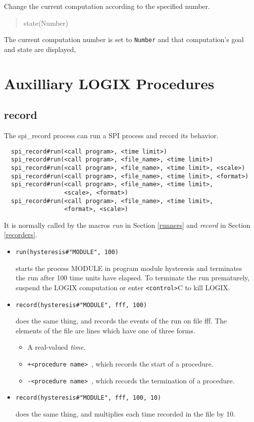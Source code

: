 Change the current computation according to the specified number.

\begin{verse}
    state(Number) 
\end{verse}

The current computation number is set to \verb+Number+ and
that computation's goal and state are displayed,

\chapter{Auxilliary LOGIX Procedures}
\label{auxilliary}

\section{record}
\label{record}

The spi\_record process can run a SPI process
and record its behavior.

\begin{verbatim}
  spi_record#run(<call program>, <time limit>)
  spi_record#run(<call program>, <file_name>, <time limit>)
  spi_record#run(<call program>, <file_name>, <time limit>, <scale>)
  spi_record#run(<call program>, <file_name>, <time limit>, <format>)
  spi_record#run(<call program>, <file_name>, <time limit>,
                 <scale>, <format>)
  spi_record#run(<call program>, <file_name>, <time limit>,
                 <format>, <scale>)
\end{verbatim}

\noindent
It is normally called by the macros {\em run} in Section
\ref{runners} and {\em record} in Section \ref{recorders}.

\begin{itemize}
\item
  \verb+run(hysteresis#"MODULE", 100)+

\noindent
starts the process  MODULE  in program module  hysteresis  and
terminates the run after 100 time units have elapsed.  To 
terminate the run prematurely, suspend the LOGIX computation
or enter  \verb+<control>+C  to kill LOGIX.

\item
  \verb+record(hysteresis#"MODULE", fff, 100)+

\noindent
does the same thing, and records the events of the run on file fff.
The elements of the file are lines which have one of three forms.
\begin{itemize}
\item
A real-valued {\em time}.
\item
\verb:+<procedure name> :, which records the start of a procedure.
\item
\verb:-<procedure name> :, which records the termination of a procedure.
\end{itemize}

\item
  \verb+record(hysteresis#"MODULE", fff, 100, 10)+

\noindent
does the same thing, and multiplies each time recorded in the file
by 10.
\end{itemize}

